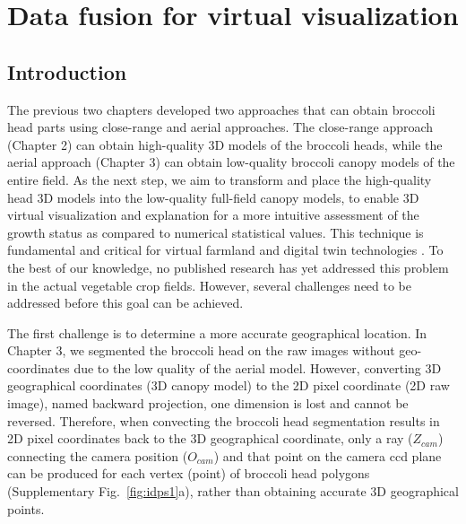 \chapter{Data fusion for virtual visualization}

\section{Introduction}

The previous two chapters developed two approaches that can obtain broccoli head parts using close-range and aerial approaches. The close-range approach (Chapter 2) can obtain high-quality 3D models of the broccoli heads, while the aerial approach (Chapter 3) can obtain low-quality broccoli canopy models of the entire field. As the next step, we aim to transform and place the high-quality head 3D models into the low-quality full-field canopy models, to enable 3D virtual visualization and explanation for a more intuitive assessment of the growth status as compared to numerical statistical values. This technique is fundamental and critical for virtual farmland and digital twin technologies \citep{pylianidis_introducing_2021, slob_virtual_2023}. To the best of our knowledge, no published research has yet addressed this problem in the actual vegetable crop fields. However, several challenges need to be addressed before this goal can be achieved.

The first challenge is to determine a more accurate geographical location. In Chapter 3, we segmented the broccoli head on the raw images without geo-coordinates due to the low quality of the aerial model. However, converting 3D geographical coordinates (3D canopy model) to the 2D pixel coordinate (2D raw image), named backward projection, one dimension is lost and cannot be reversed. Therefore, when convecting the broccoli head segmentation results in 2D pixel coordinates back to the 3D geographical coordinate, only a ray ($Z_{cam}$) connecting the camera position ($O_{cam}$) and that point on the camera \gls{ccd} plane can be produced for each vertex (point) of broccoli head polygons (Supplementary Fig.~\ref{fig:idps1}a), rather than obtaining accurate 3D geographical points.

